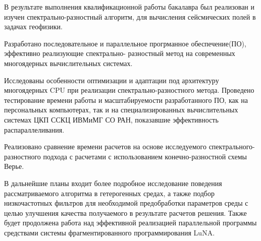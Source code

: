 
В результате выполнения квалификационной работы бакалавра был реализован и изучен спектрально-разностный алгоритм,
для вычисления сейсмических полей в задачах геофизики.

Разработано последовательное и параллельное прогрманное обеспечение(ПО), эффективно реализующие спектрально-
разностный метод на современных многоядерных вычислительных системах.

Исследованы особенности оптимизации и адаптации под архитектуру многоядерных CPU при реализации спектрально-разностного метода. Проведено тестирование времени работы и масштабируемости разработанного ПО, как на персональных компьютерах,
так и на специализированных вычислительных системах ЦКП ССКЦ ИВМиМГ СО РАН, показавшие эффективность распараллеливания.

Реализовано сравнение времени расчетов на основе исследуемого спектрального-разностного подхода с расчетами с использованием конечно-разностной схемы Верье. 



В дальнейшие планы входит более подробное исследование поведения рассматриваемого алгоритма в гетерогенных средах,
а также подбор низкочастотных фильтров для необходимой предобработки параметров среды с целью улучшения качества получаемого в результате расчетов решения.
Также будет продолжена работа над эффективной реализацией параллельной программы
средствами системы фрагментированного программирования LuNA.

\clearpage
